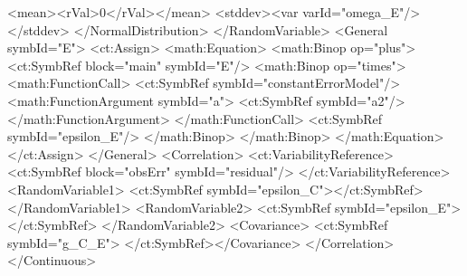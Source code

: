 \documentclass[a4paper,11pt]{article}
\newcommand{\pharmml}{PharmML\xspace}
\newcommand{\xelem}[1]{\texttt{<#1>}\index{XML Element!\texttt{<#1>}}}
\begin{document}
\begin{xmlcode}
                        <mean><rVal>0</rVal></mean>
                        <stddev><var varId="omega_E"/></stddev>
                    </NormalDistribution>
                </RandomVariable>
                <General symbId="E">
                    <ct:Assign>
                        <math:Equation>
                            <math:Binop op="plus">
                                <ct:SymbRef block="main" symbId="E"/>
                                <math:Binop op="times">
                                    <math:FunctionCall>
                                        <ct:SymbRef symbId="constantErrorModel"/>
                                        <math:FunctionArgument symbId="a">
                                            <ct:SymbRef symbId="a2"/>
                                        </math:FunctionArgument>
                                    </math:FunctionCall>
                                    <ct:SymbRef symbId="epsilon_E"/>
                                </math:Binop>
                            </math:Binop>
                        </math:Equation>
                    </ct:Assign>
                </General>
                <Correlation>
                    <ct:VariabilityReference>
                        <ct:SymbRef block="obsErr" symbId="residual"/>
                    </ct:VariabilityReference>
                    <RandomVariable1>
                        <ct:SymbRef symbId="epsilon_C"></ct:SymbRef>
                    </RandomVariable1>
                    <RandomVariable2>
                        <ct:SymbRef symbId="epsilon_E"></ct:SymbRef>
                    </RandomVariable2>
                    <Covariance>
                        <ct:SymbRef symbId="g_C_E">
                    </ct:SymbRef></Covariance>
                </Correlation>
            </Continuous>
\end{xmlcode}


\end{document}

